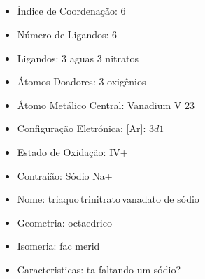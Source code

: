 \documentclass[12pt]{article}
\begin{document}
\noindent\begin{minipage}{\textwidth}
	
	\subsection{}
	\begin{itemize}
   
   \item Índice de Coordenação:
   	6
   
   \item Número de Ligandos:
   	6
   
   \item Ligandos:
   	3 aguas 3 nitratos
   
   \item Átomos Doadores:
   	3 oxigênios
   
   \item Átomo Metálico Central:
   	Vanadium V 23
   
   \item Configuração Eletrónica:
   	[Ar]: $ 3d1 $
   
   \item Estado de Oxidação:
   	IV+
   
   \item Contraião:
   	Sódio Na+
   
   \item Nome:
   	triaquo\,trinitrato\,vanadato de sódio
   
   \item Geometria:
   	octaedrico
   
   \item Isomeria:
		fac merid

	\item Caracteristicas:
		ta faltando um sódio?

	\end{itemize}
	
\end{minipage}
\end{document}
